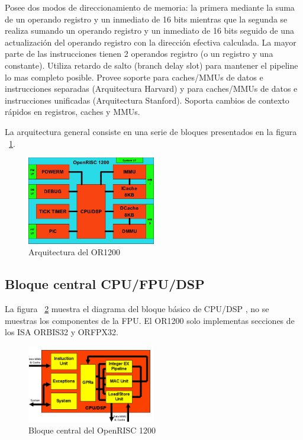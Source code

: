 	Posee dos modos de direccionamiento de memoria: la primera mediante la suma de un operando registro y un inmediato de 16 bits mientras que la segunda
	se realiza sumando un operando registro y un inmediato de 16 bits seguido de una actualización del operando registro con la dirección efectiva
	calculada. La mayor parte de las instrucciones tienen 2 operandos registro (o un registro y una constante). Utiliza retardo de salto (branch delay
	slot) para mantener el pipeline lo mas completo posible. Provee soporte para caches/MMUs de datos e instrucciones separadas (Arquitectura Harvard) y
	para caches/MMUs de datos e instrucciones unificadas (Arquitectura Stanford). Soporta cambios de contexto rápidos en registros, caches y MMUs.
	  
	La arquitectura general consiste en una serie de bloques presentados en la figura ~\ref{fig:ArqOR1200}.
		
	\begin{figure}[h!]
 	\begin{center}
  	\includegraphics[width=0.5\textwidth,keepaspectratio=true]{./images/OR1200}
  	\caption{Arquitectura del OR1200}
  	\label{fig:ArqOR1200}
 	\end{center}
	\end{figure}

	\subsection{Bloque central CPU/FPU/DSP}

	
	La figura ~\ref{fig:cpufpudsp} muestra el diagrama del bloque básico de CPU/DSP , no se muestras los componentes de la FPU. El OR1200 solo
	implementas secciones de los ISA ORBIS32 y ORFPX32. 

	
	\begin{figure}[!h]
 	\begin{center}
  	\includegraphics[width=0.5\textwidth,keepaspectratio=true]{./images/cpu_fpu_dsp}
  	\caption{Bloque central del OpenRISC 1200}
  	\label{fig:cpufpudsp}
 	\end{center}
	\end{figure}
	
